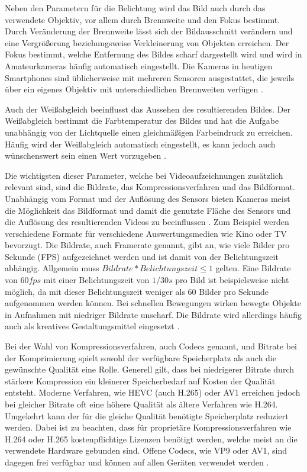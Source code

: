 Neben den Parametern für die Belichtung wird das Bild auch durch das verwendete Objektiv, vor allem durch Brennweite und den Fokus bestimmt.
Durch Veränderung der Brennweite lässt sich der Bildausschnitt verändern und eine Vergrößerung beziehungsweise Verkleinerung von Objekten erreichen.
Der Fokus bestimmt, welche Entfernung des Bildes scharf dargestellt wird und wird in Amateurkameras häufig automatisch eingestellt.
Die Kameras in heutigen Smartphones sind üblicherweise mit mehreren Sensoren ausgestattet, die jeweils über ein eigenes Objektiv mit unterschiedlichen Brennweiten verfügen \cite[S. 499ff.]{Schmidt_Videotechnik}.

Auch der Weißabgleich beeinflusst das Aussehen des resultierenden Bildes.
Der Weißabgleich bestimmt die Farbtemperatur des Bildes und hat die Aufgabe unabhängig von der Lichtquelle einen gleichmäßigen Farbeindruck zu erreichen.
Häufig wird der Weißabgleich automatisch eingestellt, es kann jedoch auch wünschenswert sein einen Wert vorzugeben \cite[S. 434ff.]{Schmidt_Videotechnik}.

Die wichtigsten dieser Parameter, welche bei Videoaufzeichnungen zusätzlich relevant sind, sind die Bildrate, das Kompressionsverfahren und das Bildformat.
Unabhängig vom Format und der Auflösung des Sensors bieten Kameras meist die Möglichkeit das Bildformat und damit die genutzte Fläche des Sensors und die Auflösung des resultierenden Videos zu beeinflussen \cite[S. 422]{Schmidt_Videotechnik}.
Zum Beispiel werden verschiedene Formate für verschiedene Auswertungsmedien wie Kino oder TV bevorzugt.
Die Bildrate, auch Framerate genannt, gibt an, wie viele Bilder pro Sekunde (\ac{FPS}) aufgezeichnet werden und ist damit von der Belichtungszeit abhängig.
Allgemein muss $Bildrate * Belichtungszeit \leq 1$ gelten.
Eine Bildrate von $60 fps$ mit einer Belichtungszeit von $1/30 s$ pro Bild ist beispielsweise nicht möglich, da mit dieser Belichtungszeit weniger als 60 Bilder pro Sekunde aufgenommen werden können.
Bei schnellen Bewegungen wirken bewegte Objekte in Aufnahmen mit niedriger Bildrate unscharf.
Die Bildrate wird allerdings häufig auch als kreatives Gestaltungsmittel eingesetzt \cite[S. 174f.]{Schmidt_Videotechnik}.

Bei der Wahl von Kompressionsverfahren, auch Codecs genannt, und Bitrate bei der Komprimierung spielt sowohl der verfügbare Speicherplatz als auch die gewünschte Qualität eine Rolle.
Generell gilt, dass bei niedrigerer Bitrate durch stärkere Kompression ein kleinerer Speicherbedarf auf Kosten der Qualität entsteht.
Moderne Verfahren, wie \ac{HEVC} (auch H.265)  oder AV1 erreichen jedoch bei gleicher Bitrate oft eine höhere Qualität als ältere Verfahren wie H.264.
Umgekehrt kann der für die gleiche Qualität benötigte Speicherplatz reduziert werden.
Dabei ist zu beachten, dass für proprietäre Kompressionsverfahren wie H.264 oder H.265 kostenpflichtige Lizenzen benötigt werden, welche meist an die verwendete Hardware gebunden sind.
Offene Codecs, wie VP9 oder AV1, sind dagegen frei verfügbar und können auf allen Geräten verwendet werden \cite[S. 253ff.]{Schmidt_Videotechnik}.



